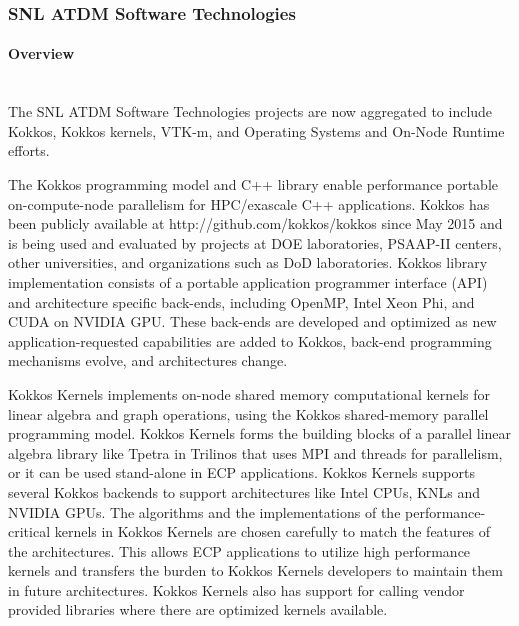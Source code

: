 \subsubsection{ SNL ATDM Software Technologies}

\paragraph{Overview} \leavevmode \\

The SNL ATDM Software Technologies projects are now aggregated to include Kokkos, Kokkos kernels, VTK-m, and Operating Systems and On-Node Runtime efforts. 

The Kokkos programming model and C++ library enable performance portable on-compute-node parallelism for HPC/exascale C++ applications. Kokkos has been publicly available at http://github.com/kokkos/kokkos since May 2015 and is being used and evaluated by projects at DOE laboratories, PSAAP-II centers, other universities, and organizations such as DoD laboratories. Kokkos library implementation consists of a portable application programmer interface (API) and architecture specific back-ends, including OpenMP, Intel Xeon Phi, and CUDA on NVIDIA GPU. These back-ends are developed and optimized as new application-requested capabilities are added to Kokkos, back-end programming mechanisms evolve, and architectures change.

Kokkos Kernels implements on-node shared memory computational kernels for linear algebra and graph operations, using the Kokkos shared-memory parallel programming model. Kokkos Kernels forms the building blocks of a parallel linear algebra library like Tpetra in Trilinos that uses MPI and threads for parallelism, or it can be used stand-alone in ECP applications. Kokkos Kernels supports several Kokkos backends to support architectures like Intel CPUs, KNLs and NVIDIA GPUs. The algorithms and the implementations of the performance-critical kernels in Kokkos Kernels are chosen carefully to match the features of the architectures. This allows ECP applications to utilize high performance kernels and transfers the burden to Kokkos Kernels developers to maintain them in future architectures. Kokkos Kernels also has support for calling vendor provided libraries where there are optimized kernels available.

